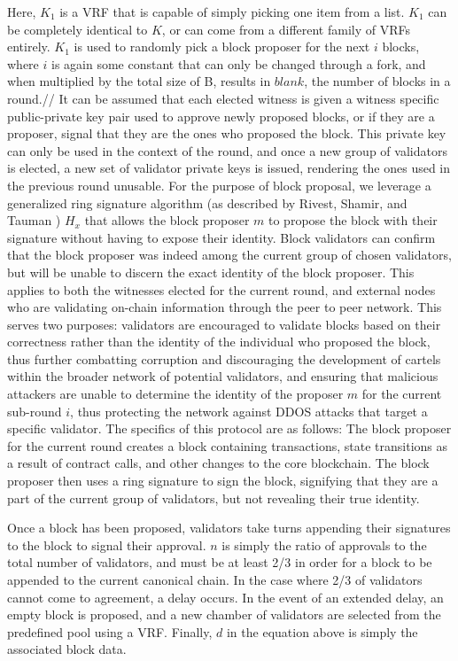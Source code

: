\documentclass[conference]{IEEEtran}
\begin{document}
Here, $K_1$ is a VRF that is capable of simply picking one item from a list. $K_1$ can be completely identical to $K$, or can come from a different family of VRFs entirely. $K_1$ is used to randomly pick a block proposer for the next $i$ blocks, where $i$ is again some constant that can only be changed through a fork, and when multiplied by the total size of B, results in $blank$, the number of blocks in a round.//
It can be assumed that each elected witness is given a witness specific public-private key pair used to approve newly proposed blocks, or if they are a proposer, signal that they are the ones who proposed the block. This private key can only be used in the context of the round, and once a new group of validators is elected, a new set of validator private keys is issued, rendering the ones used in the previous round unusable. For the purpose of block proposal, we leverage a generalized ring signature algorithm (as described by Rivest, Shamir, and Tauman \cite{Rivest2001}) $H_x$ that allows the block proposer $m$ to propose the block with their signature without having to expose their identity. Block validators can confirm that the block proposer was indeed among the current group of chosen validators, but will be unable to discern the exact identity of the block proposer. This applies to both the witnesses elected for the current round, and external nodes who are validating on-chain information through the peer to peer network. This serves two purposes: validators are encouraged to validate blocks based on their correctness rather than the identity of the individual who proposed the block, thus further combatting corruption and discouraging the development of cartels within the broader network of potential validators, and ensuring that malicious attackers are unable to determine the identity of the proposer $m$ for the current sub-round $i$, thus protecting the network against DDOS attacks that target a specific validator. The specifics of this protocol are as follows: The block proposer for the current round creates a block containing transactions, state transitions as a result of contract calls, and other changes to the core blockchain. The block proposer then uses a ring signature to sign the block, signifying that they are a part of the current group of validators, but not revealing their true identity. 



Once a block has been proposed, validators take turns appending their signatures to the block to signal their approval. $n$ is simply the ratio of approvals to the total number of validators, and must be at least 2/3 in order for a block to be appended to the current canonical chain. In the case where 2/3 of validators cannot come to agreement, a delay occurs. In the event of an extended delay, an empty block is proposed, and a new chamber of validators are selected from the predefined pool using a VRF.  Finally, $d$ in the equation above is simply the associated block data.\\
\end{document}
